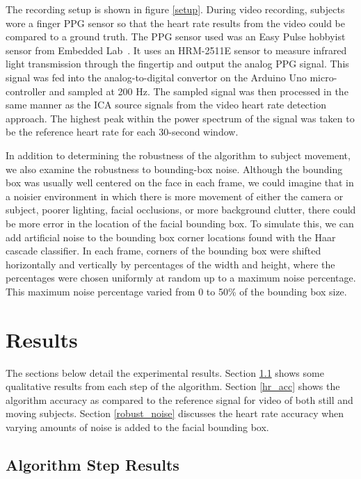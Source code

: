 \documentclass[10pt,twocolumn,letterpaper]{article}
\begin{document}
The recording setup is shown in figure \ref{setup}. During video recording, subjects wore a finger PPG sensor so that the heart rate results from the video could be compared to a ground truth. The PPG sensor used was an Easy Pulse hobbyist sensor from Embedded Lab~\cite{Bhatt:aa}. It uses an HRM-2511E sensor to measure infrared light transmission through the fingertip and output the analog PPG signal. This signal was fed into the analog-to-digital convertor on the Arduino Uno micro-controller and sampled at 200 Hz. The sampled signal was then processed in the same manner as the ICA source signals from the video heart rate detection approach. The highest peak within the power spectrum of the signal was taken to be the reference heart rate for each 30-second window.

In addition to determining the robustness of the algorithm to subject movement, we also examine the robustness to bounding-box noise. Although the bounding box was usually well centered on the face in each frame, we could imagine that in a noisier environment in which there is more movement of either the camera or subject, poorer lighting, facial occlusions, or more background clutter, there could be more error in the location of the facial bounding box. To simulate this, we can add artificial noise to the bounding box corner locations found with the Haar cascade classifier. In each frame, corners of the bounding box were shifted horizontally and vertically by percentages of the width and height, where the percentages were chosen uniformly at random up to a maximum noise percentage. This maximum noise percentage varied from 0 to 50\% of the bounding box size.

\section{Results} \label{results}

The sections below detail the experimental results. Section \ref{step_results} shows some qualitative results from each step of the algorithm. Section \ref{hr_acc} shows the algorithm accuracy as compared to the reference signal for video of both still and moving subjects. Section \ref{robust_noise} discusses the heart rate accuracy when varying amounts of noise is added to the facial bounding box.

\subsection{Algorithm Step Results} \label{step_results}
\end{document}
